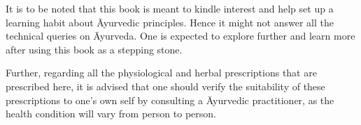 
It is to be noted that this book is meant to kindle interest and help set up a learning habit about Āyurvedic principles. Hence it might not answer all the technical queries on Āyurveda. One is expected to explore further and learn more after using this book as a stepping stone.

Further, regarding all the physiological and herbal prescriptions that are prescribed here, it is advised that one should verify the suitability of these prescriptions to one’s own self by consulting a Āyurvedic practitioner, as the health condition will vary from person to person.
